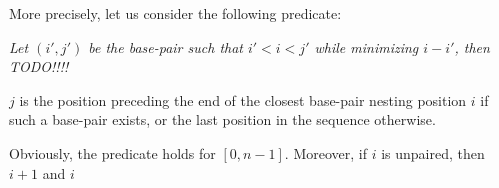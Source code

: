 More precisely, let us consider the following predicate: {\em Let $(i',j')$ be the base-pair such that $i'<i<j'$ while minimizing $i-i'$, then TODO!!!!

$j$ is the position preceding the end of the closest base-pair nesting position $i$ if such a base-pair exists, or the last position in the sequence otherwise.} Obviously, the predicate holds for $[0,n-1]$. Moreover, if $i$ is unpaired, then $i+1$ and $i$



